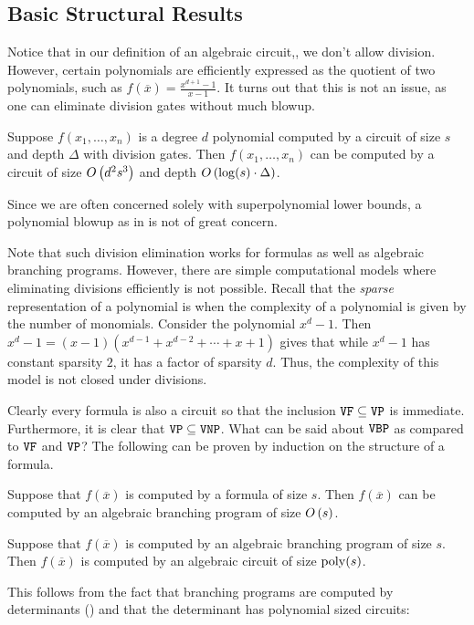 \documentclass[letterpaper, 11pt]{amsart}
\newif\iffull
\begin{document}
\iffull
\subsection{Basic Structural Results}

Notice that in our definition of an algebraic circuit,, we don't allow division.
However, certain polynomials are efficiently expressed as the quotient of two polynomials, such as $f(\overline{x}) = \frac{x^{d + 1} - 1}{x - 1}$.
It turns out that this is not an issue, as one can eliminate division gates without much blowup.

\begin{lem}\label{lem:div_elim}
  Suppose $f(x_1, \ldots, x_n)$ is a degree $d$ polynomial computed by a circuit of size $s$ and depth $\Delta$ with division gates.
  Then $f(x_1, \ldots, x_n)$ can be computed by a circuit of size $O\kern-0.0pt\left(d^2 s^3\right)$ and depth $O\kern-0.0pt\left(\log(s) \cdot \Delta\right)$.
\end{lem}

Since we are often concerned solely with superpolynomial lower bounds, a polynomial blowup as in  is not of great concern.

\begin{rmk}
  Note that such division elimination works for formulas as well as algebraic branching programs.
  However, there are simple computational models where eliminating divisions efficiently is not possible.
  Recall that the \emph{sparse} representation of a polynomial is when the complexity of a polynomial is given by the number of monomials.
  Consider the polynomial $x^{d} - 1$.
  Then $x^d - 1 = (x - 1)(x^{d - 1} + x^{d - 2} + \cdots + x + 1)$ gives that while $x^d - 1$ has constant sparsity $2$, it has a factor of sparsity $d$.
  Thus, the complexity of this model is not closed under divisions.
\end{rmk}

Clearly every formula is also a circuit so that the inclusion $\operatorname{\texttt{VF}} \subseteq \operatorname{\texttt{VP}}$ is immediate.
Furthermore, it is clear that $\operatorname{\texttt{VP}} \subseteq \operatorname{\texttt{VNP}}$.
What can be said about $\operatorname{\texttt{VBP}}$ as compared to $\operatorname{\texttt{VF}}$ and $\operatorname{\texttt{VP}}$?
The following can be proven by induction on the structure of a formula.
\begin{lem}
  Suppose that $f(\overline{x})$ is computed by a formula of size $s$.
  Then $f(\overline{x})$ can be computed by an algebraic branching program of size $O\kern-0.0pt\left(s\right)$.
\end{lem}

\begin{lem}
  Suppose that $f(\overline{x})$ is computed by an algebraic branching program of size $s$.
  Then $f(\overline{x})$ is computed by an algebraic circuit of size $\operatorname{poly}(s)$.
\end{lem}
This follows from the fact that branching programs are computed by determinants () and that the determinant has polynomial sized circuits:
\end{document}

